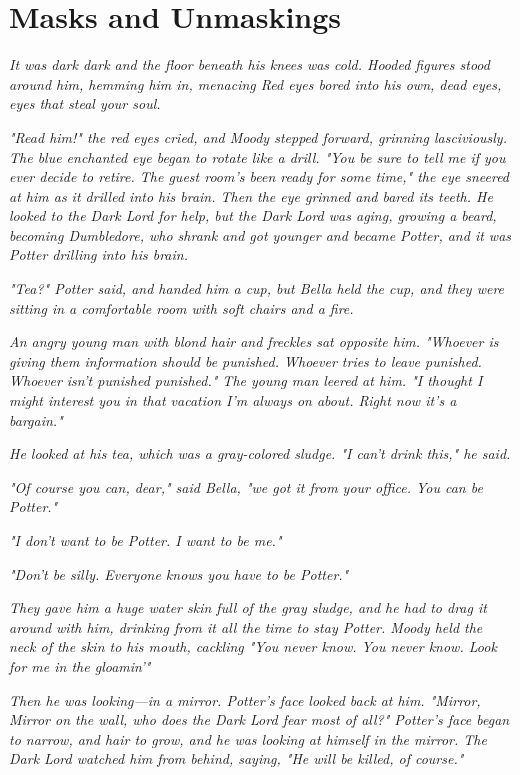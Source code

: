 
\chapter{Masks and Unmaskings}

\emph{It was dark{\el} dark{\el} and the floor beneath his knees was cold. Hooded figures stood around him, hemming him in, menacing{\el} Red eyes bored into his own, dead eyes, eyes that steal your soul.}

\emph{"Read him!" the red eyes cried, and Moody stepped forward, grinning lasciviously. The blue enchanted eye began to rotate like a drill. "You be sure to tell me if you ever decide to retire. The guest room's been ready for some time," the eye sneered at him as it drilled into his brain. Then the eye grinned and bared its teeth. He looked to the Dark Lord for help, but the Dark Lord was aging, growing a beard, becoming Dumbledore, who shrank and got younger and became Potter, and it was Potter drilling into his brain.}

\emph{"Tea?" Potter said, and handed him a cup, but Bella held the cup, and they were sitting in a comfortable room with soft chairs and a fire.}

\emph{An angry young man with blond hair and freckles sat opposite him. "Whoever is giving them information should be punished. Whoever tries to leave{\el} punished. Whoever isn't punished{\el} punished." The young man leered at him. "I thought I might interest you in that vacation I'm always on about. Right now it's a bargain."}

\emph{He looked at his tea, which was a gray-colored sludge. "I can't drink this," he said.}

\emph{"Of course you can, dear," said Bella, "we got it from your office. You can be Potter."}

\emph{"I don't want to be Potter. I want to be me."}

\emph{"Don't be silly. Everyone knows you have to be Potter."}

\emph{They gave him a huge water skin full of the gray sludge, and he had to drag it around with him, drinking from it all the time to stay Potter. Moody held the neck of the skin to his mouth, cackling "You never know. You never know. Look for me in the gloamin'"}

\emph{Then he was looking—in a mirror. Potter's face looked back at him. "Mirror, Mirror on the wall, who does the Dark Lord fear most of all?" Potter's face began to narrow, and hair to grow, and he was looking at himself in the mirror. The Dark Lord watched him from behind, saying, "He will be killed, of course."}

